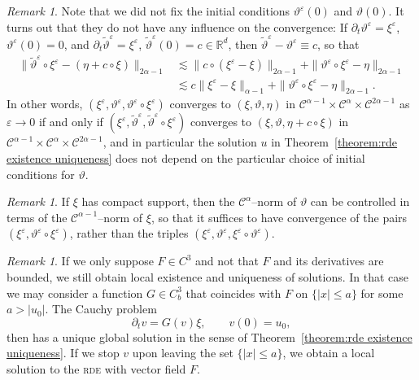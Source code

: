 \documentclass[11pt,a4paper]{article}
\theoremstyle{remark}
\newtheorem{remark}[theorem]{Remark}
\newcommand{\CC}{\ensuremath{\mathscr{C}}}
\begin{document}
\begin{remark}\label{remark:ode initial condition theta}
  Note that we did not fix the initial conditions $\vartheta^{\varepsilon}(0)$ and $\vartheta(0)$. It turns out that they do not have any influence on the convergence: If $\partial_t \vartheta^\varepsilon = \xi^\varepsilon$, $\vartheta^\varepsilon(0) = 0$, and
  $\partial_{t} \tilde{\vartheta}^{\varepsilon} = \xi^{\varepsilon}$,
  $\tilde{\vartheta}^{\varepsilon} ( 0 ) =c \in \mathbb{R}^d$, then
  $\tilde{\vartheta}^{\varepsilon} - \vartheta^{\varepsilon} \equiv c$, so
  that
  \begin{align*}
     \| \tilde{\vartheta}^{\varepsilon} \circ \xi^{\varepsilon} - ( \eta +c \circ \xi ) \|_{2 \alpha -1} & \lesssim \| c \circ ( \xi^{\varepsilon} - \xi ) \|_{2 \alpha -1} + \| \vartheta^{\varepsilon} \circ
     \xi^{\varepsilon} - \eta \|_{2 \alpha -1} \\
     & \lesssim c \| \xi^{\varepsilon} - \xi \|_{\alpha -1} + \| \vartheta^{\varepsilon} \circ \xi^{\varepsilon} - \eta \|_{2 \alpha -1} .
  \end{align*}
  In other words, $( \xi^{\varepsilon} , \vartheta^\varepsilon, \vartheta^{\varepsilon} \circ \xi^{\varepsilon} )$ converges to $(\xi , \vartheta, \eta)$ in
  $\CC^{\alpha -1} \times \CC^\alpha \times \CC^{2 \alpha -1}$ as $\varepsilon \rightarrow 0$ if and only if $  ( \xi^{\varepsilon} , \tilde{\vartheta}^\varepsilon, \tilde{\vartheta}^{\varepsilon} \circ \xi^{\varepsilon} )$ converges to $(\xi , \vartheta, \eta +c \circ \xi )$ in $\CC^{\alpha -1} \times \CC^\alpha \times \CC^{2 \alpha -1}$, and in particular the solution $u$ in Theorem~\ref{theorem:rde existence uniqueness} does not depend on the particular choice of initial conditions for $\vartheta$.
\end{remark}

\begin{remark}
   If $\xi$ has compact support, then the $\CC^\alpha$--norm of $\vartheta$ can be controlled in terms of the $\CC^{\alpha-1}$--norm of $\xi$, so that it suffices to have convergence of the pairs $(\xi^\varepsilon, \vartheta^\varepsilon \circ \xi^\varepsilon)$, rather than the triples $( \xi^{\varepsilon} , \vartheta^{\varepsilon} , \xi^{\varepsilon} \circ \vartheta^{\varepsilon} )$.
\end{remark}

\begin{remark}
  If we only suppose $F \in C^{3}$ and not that $F$ and its derivatives are
  bounded, we still obtain local existence and uniqueness of solutions. In
  that case we may consider a function $G \in C^{3}_{b}$ that coincides with
  $F$ on $\{ | x | \leqslant a \}$ for some $a> | u_{0} |$. The Cauchy problem
  \[
     \partial_{t} v=G ( v ) \xi , \hspace{2em} v ( 0 ) =u_{0},
  \]
  then has a unique global solution in the sense of Theorem~\ref{theorem:rde
  existence uniqueness}. If we stop $v$ upon leaving the set $\{ | x | \leqslant a \}$, we obtain a local solution to the \textsc{rde} with vector field
  $F$.
\end{remark}
\end{document}
